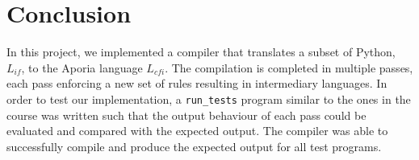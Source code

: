 \section{Conclusion}

In this project, we implemented a compiler that translates a subset of Python, $L_{if}$, to the Aporia language $L_{cfi}$.
The compilation is completed in multiple passes, each pass enforcing a new set of rules resulting in intermediary languages.
In order to test our implementation, a \texttt{run\_tests} program similar to the ones in the course was written such that the 
output behaviour of each pass could be evaluated and compared with the expected output.
The compiler was able to successfully compile and produce the expected output for all test programs.
